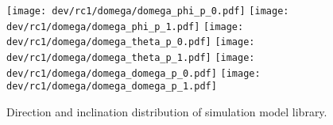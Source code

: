 % 
% 
\begin{figure}[!t]
    \centering
    \texttt{[image: dev/rc1/domega/domega\_phi\_p\_0.pdf]}
    \texttt{[image: dev/rc1/domega/domega\_phi\_p\_1.pdf]}
    \texttt{[image: dev/rc1/domega/domega\_theta\_p\_0.pdf]}
    \texttt{[image: dev/rc1/domega/domega\_theta\_p\_1.pdf]}
    \texttt{[image: dev/rc1/domega/domega\_domega\_p\_0.pdf]}
    \texttt{[image: dev/rc1/domega/domega\_domega\_p\_1.pdf]}
    \caption[Boxplot]{Direction and inclination distribution of simulation model library. }
\end{figure}
